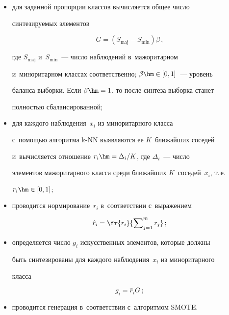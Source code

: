 \begin{enumerate}[(1)]
  \begin{itemize}


  \item[(а)] для заданной пропорции классов вычисляется общее число 


синтези\-ру\-емых элементов


  $$


  G=\left( S_{\mathrm{maj}}-S_{\mathrm{min}}\right) \beta\,,


  $$


где $S_{\mathrm{maj}}$ и~$S_{\mathrm{min}}$~--- число наблюдений в~мажоритарном 


и~миноритарном классах соответственно; $\beta\hm \in [0,1]$~--- уровень 


баланса выборки. Если $\beta\hm=1$, то после синтеза выборка станет 


полностью сбалансированной;


  \item[(б)] для каждого наблюдения~$x_i$ из миноритарного класса  


с~по\-мощью алгоритма k-NN выявляются ее $K$~ближайших соседей 


и~вычисляется отношение $r_i\hm= \Delta_i/K$, где $\Delta_i$~--- число 


элементов мажоритарного класса среди ближайших $K$~соседей~$x_i$, т.\,е.\ 


$r_i\hm\in [0,1]$;


  \item[(в)]  проводится нормирование~$r_i$ в~соответствии с~выражением


  $$


  \hat{r}_i=\fr{r_i}{\sum\nolimits^m_{j=1} r_j}\,;


  $$


  \item[(г)] определяется число $g_i$ искусственных элементов, которые должны 


быть синтезированы для каждого наблюдения~$x_i$ из миноритарного 


класса


  $$


  g_i=\hat{r}_i G\,;


  $$


  \item[(д)] проводится генерация в~соответствии с~алгоритмом SMOTE.


  \end{itemize}


  



\end{enumerate}
